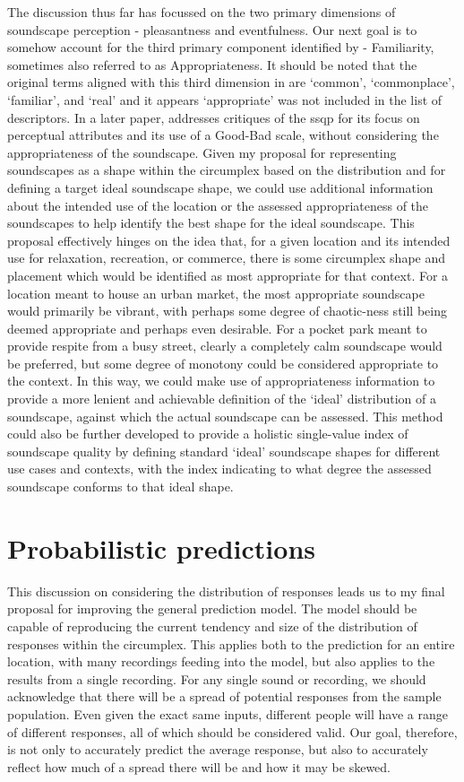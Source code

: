 The discussion thus far has focussed on the two primary dimensions of soundscape perception - pleasantness and eventfulness. Our next goal is to somehow account for the third primary component identified by \citet{Axelsson2010principal} - Familiarity, sometimes also referred to as Appropriateness. It should be noted that the original terms aligned with this third dimension in \citet{Axelsson2010principal} are `common', `commonplace', `familiar', and `real' and it appears `appropriate' was not included in the list of descriptors. In a later paper, \citet{Axelsson2015How} addresses critiques of the \gls{ssqp} for its focus on perceptual attributes and its use of a Good-Bad scale, without considering the appropriateness of the soundscape. Given my proposal for representing soundscapes as a shape within the circumplex based on the distribution and for defining a target ideal soundscape shape, we could use additional information about the intended use of the location or the assessed appropriateness of the soundscapes to help identify the best shape for the ideal soundscape. This proposal effectively hinges on the idea that, for a given location and its intended use for relaxation, recreation, or commerce, there is some circumplex shape and placement which would be identified as most appropriate for that context. For a location meant to house an urban market, the most appropriate soundscape would primarily be vibrant, with perhaps some degree of chaotic-ness still being deemed appropriate and perhaps even desirable. For a pocket park meant to provide respite from a busy street, clearly a completely calm soundscape would be preferred, but some degree of monotony could be considered appropriate to the context. In this way, we could make use of appropriateness information to provide a more lenient and achievable definition of the `ideal' distribution of a soundscape, against which the actual soundscape can be assessed. This method could also be further developed to provide a holistic single-value index of soundscape quality by defining standard `ideal' soundscape shapes for different use cases and contexts, with the index indicating to what degree the assessed soundscape conforms to that ideal shape.

\section{Probabilistic predictions}
\label{sec:probPred}
This discussion on considering the distribution of responses leads us to my final proposal for improving the general prediction model. The model should be capable of reproducing the current tendency and size of the distribution of responses within the circumplex. This applies both to the prediction for an entire location, with many recordings feeding into the model, but also applies to the results from a single recording. For any single sound or recording, we should acknowledge that there will be a spread of potential responses from the sample population. Even given the exact same inputs, different people will have a range of different responses, all of which should be considered valid. Our goal, therefore, is not only to accurately predict the average response, but also to accurately reflect how much of a spread there will be and how it may be skewed. 

